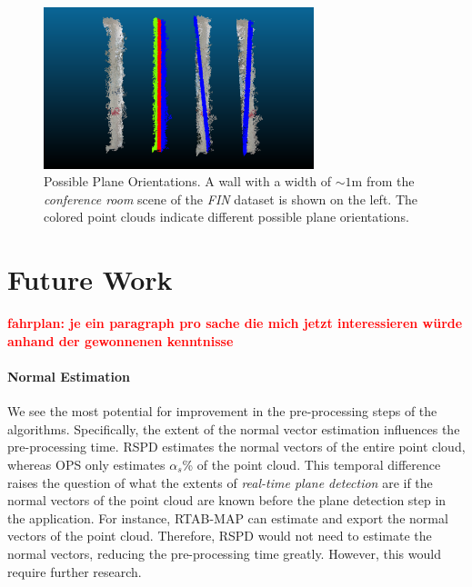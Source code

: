 \documentclass[main.tex]{subfiles}
\begin{document}
\begin{figure}
    \centering
    \includegraphics[width=0.7\textwidth]{images/possible_planes.png}
    \caption[Possible Plane Orientations]{Possible Plane Orientations. A wall with a width of ${\sim}1$m from the \textit{conference room} scene of the \textit{FIN} dataset is shown on the left. The colored point clouds indicate different possible plane orientations.}
    \label{fig:poss-planes}
\end{figure}

\section{Future Work}
\textbf{\textcolor{red}{fahrplan: je ein paragraph pro sache die mich jetzt interessieren würde anhand der gewonnenen kenntnisse}}

\paragraph{Normal Estimation}
We see the most potential for improvement in the pre-processing steps of the algorithms. Specifically, the extent of the normal vector estimation influences the pre-processing time. RSPD estimates the normal vectors of the entire point cloud, whereas OPS only estimates $\alpha_s$\% of the point cloud. This temporal difference raises the question of what the extents of \textit{real-time plane detection} are if the normal vectors of the point cloud are known before the plane detection step in the application. For instance, RTAB-MAP can estimate and export the normal vectors of the point cloud. Therefore, RSPD would not need to estimate the normal vectors, reducing the pre-processing time greatly. However, this would require further research.
\end{document}
